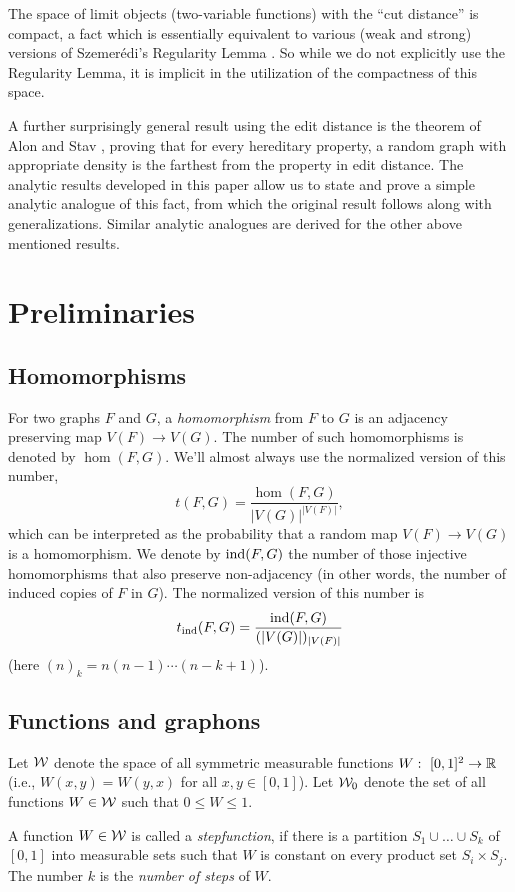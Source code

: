 \documentclass{article}
\begin{document}
The space of limit objects (two-variable functions) with the ``cut
distance'' is compact, a fact which is essentially equivalent to
various (weak and strong) versions of Szemer\'edi's Regularity Lemma
\cite{LSz2}. So while we do not explicitly use the Regularity Lemma,
it is implicit in the utilization of the compactness of this space.

A further surprisingly general result using the edit distance is the
theorem of Alon and Stav \cite{ASt}, proving that for every
hereditary property, a random graph with appropriate density is the
farthest from the property in edit distance. The analytic results
developed in this paper allow us to state and prove a simple analytic
analogue of this fact, from which the original result follows along
with generalizations. Similar analytic analogues are derived for the
other above mentioned results.

\section{Preliminaries}

\subsection{Homomorphisms}

For two graphs $F$ and $G$, a {\it homomorphism} from $F$ to $G$ is
an adjacency preserving map $V(F)\to V(G)$. The number of such
homomorphisms is denoted by $\hom(F,G)$. We'll almost always use the
normalized version of this number,
\[
t(F,G)=\frac{\hom(F,G)}{|V(G)|^{|V(F)|}},
\]
which can be interpreted as the probability that a random map
$V(F)\to V(G)$ is a homomorphism. We denote by ${\rm ind}(F,G)$ the number
of those injective homomorphisms that also preserve non-adjacency (in
other words, the number of induced copies of $F$ in $G$). The
normalized version of this number is
\[
t_{\rm ind}(F,G)=\frac{{\rm ind}(F,G)}{(|V(G)|)_{|V(F)|}}
\]
(here $(n)_k=n(n-1)\cdots(n-k+1)$).

\subsection{Functions and graphons}

Let $\mathcal{W}$ denote the space of all symmetric measurable functions
$W:~[0,1]^2\to{\mathbb R}$ (i.e., $W(x,y)=W(y,x)$ for all $x,y\in[0,1]$). Let
$\mathcal{W}_0$ denote the set of all functions $W\in\mathcal{W}$ such that $0\le
W\le 1$.

A function $W\in\mathcal{W}$ is called a {\it stepfunction}, if there is a
partition $S_1\cup\dots\cup S_k$ of $[0,1]$ into measurable sets such
that $W$ is constant on every product set $S_i\times S_j$. The number
$k$ is the {\it number of steps} of $W$.
\end{document}
